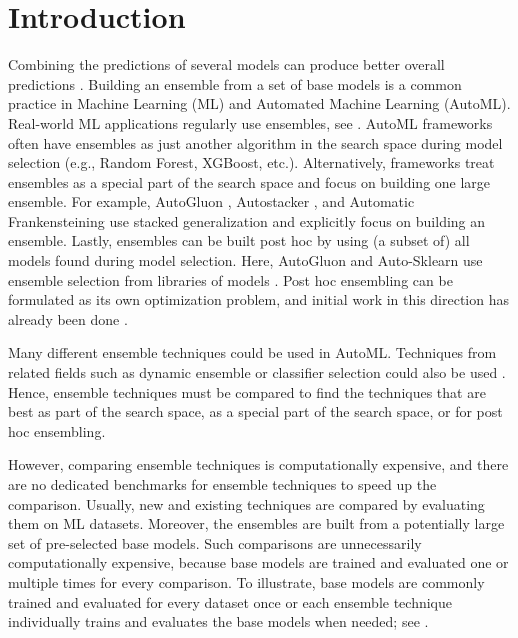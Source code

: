 \documentclass[11pt]{article}
\begin{document}
\section{Introduction}
Combining the predictions of several models can produce better overall predictions \citep{dietterich2000ensemble, kittler1998combining}.
Building an ensemble from a set of base models is a common practice in Machine Learning (ML) and Automated Machine Learning (AutoML).
Real-world ML applications regularly use ensembles, see \citep{hakak2021ensemble, gunturi2021ensemble, chung2019ensemble}. 
AutoML frameworks often have ensembles as just another algorithm in the search space during model selection (e.g., Random Forest, XGBoost, etc.). 
Alternatively, frameworks treat ensembles as a special part of the search space and focus on building one large ensemble. For example, AutoGluon \citep{erickson2020autogluon}, Autostacker \citep{chenAutostackerCompositionalEvolutionary2018}, and Automatic Frankensteining \citep{wistubaAutomaticFrankensteiningCreating2017} use stacked generalization \citep{DBLP:journals/nn/Wolpert92} and explicitly focus on building an ensemble.
Lastly, ensembles can be built post hoc by using (a subset of) all models found during model selection. 
Here, AutoGluon and Auto-Sklearn \citep{feurer-neurips15a} use ensemble selection from libraries of models \citep{caruana2004ensemble}. 
Post hoc ensembling can be formulated as its own optimization problem, and initial work in this direction has already been done \citep{zhao2022autodes}.

Many different ensemble techniques could be used in AutoML. Techniques from related fields such as dynamic ensemble or classifier selection could also be used \citep{ko2008dynamic, giacinto2001dynamic}. 
Hence, ensemble techniques must be compared to find the techniques that are best as part of the search space, as a special part of the search space, or for post hoc ensembling.

However, comparing ensemble techniques is computationally expensive, and there are no dedicated benchmarks for ensemble techniques to speed up the comparison.
Usually, new and existing techniques are compared by evaluating them on ML datasets. Moreover, the ensembles are built from a potentially large set of pre-selected base models. 
Such comparisons are unnecessarily computationally expensive, because base models are trained and evaluated one or multiple times for every comparison. 
To illustrate, base models are commonly trained and evaluated for every dataset once or each ensemble technique individually trains and evaluates the base models when needed; see \citep{cruz2018dynamic, zhao2008enhanced, cid2015discrete, van2018online, alvarez2015classifier}.
\end{document}
